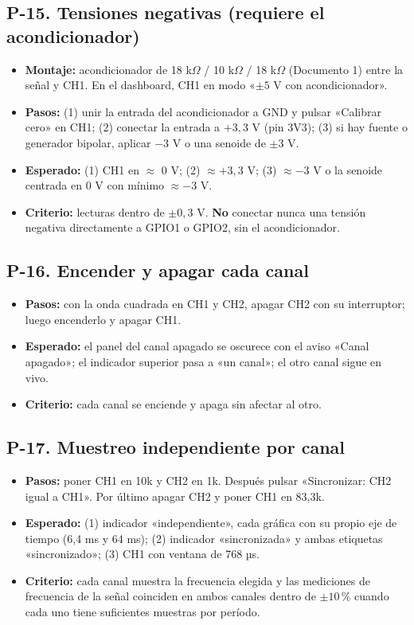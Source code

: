 \documentclass[12pt,a4paper]{article}
\begin{document}
\subsection*{P-15. Tensiones negativas (requiere el acondicionador)}
\begin{itemize}
  \item \textbf{Montaje:} acondicionador de 18 k$\Omega$ / 10 k$\Omega$ / 18 k$\Omega$ (Documento 1) entre la señal y CH1. En el dashboard, CH1 en modo «$\pm 5$ V con acondicionador».
  \item \textbf{Pasos:} (1) unir la entrada del acondicionador a GND y pulsar «Calibrar cero» en CH1; (2) conectar la entrada a $+3{,}3$ V (pin 3V3); (3) si hay fuente o generador bipolar, aplicar $-3$ V o una senoide de $\pm 3$ V.
  \item \textbf{Esperado:} (1) CH1 en $\approx$ 0 V; (2) $\approx +3{,}3$ V; (3) $\approx -3$ V o la senoide centrada en 0 V con mínimo $\approx -3$ V.
  \item \textbf{Criterio:} lecturas dentro de $\pm 0{,}3$ V. \textbf{No} conectar nunca una tensión negativa directamente a GPIO1 o GPIO2, sin el acondicionador.
\end{itemize}

\subsection*{P-16. Encender y apagar cada canal}
\begin{itemize}
  \item \textbf{Pasos:} con la onda cuadrada en CH1 y CH2, apagar CH2 con su interruptor; luego encenderlo y apagar CH1.
  \item \textbf{Esperado:} el panel del canal apagado se oscurece con el aviso «Canal apagado»; el indicador superior pasa a «un canal»; el otro canal sigue en vivo.
  \item \textbf{Criterio:} cada canal se enciende y apaga sin afectar al otro.
\end{itemize}

\subsection*{P-17. Muestreo independiente por canal}
\begin{itemize}
  \item \textbf{Pasos:} poner CH1 en 10k y CH2 en 1k. Después pulsar «Sincronizar: CH2 igual a CH1». Por último apagar CH2 y poner CH1 en 83,3k.
  \item \textbf{Esperado:} (1) indicador «independiente», cada gráfica con su propio eje de tiempo (6,4 ms y 64 ms); (2) indicador «sincronizada» y ambas etiquetas «sincronizado»; (3) CH1 con ventana de 768 µs.
  \item \textbf{Criterio:} cada canal muestra la frecuencia elegida y las mediciones de frecuencia de la señal coinciden en ambos canales dentro de $\pm 10\,\%$ cuando cada uno tiene suficientes muestras por período.
\end{itemize}
\end{document}
